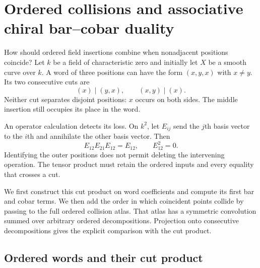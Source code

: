 \newcommand{\ogdcC}{\mathcal C}
\newcommand{\ogdDMod}{\operatorname{DMod}}
\newcommand{\ogdOrd}{\operatorname{Ord}}
\newcommand{\ogdOSurj}{\mathsf{OSurj}}
\newcommand{\ogdAlg}{\operatorname{Alg}}
\newcommand{\ogdCoalg}{\operatorname{Coalg}}
\newcommand{\ogdMod}{\operatorname{Mod}}
\newcommand{\ogdComod}{\operatorname{Comod}}
\newcommand{\ogdSym}{\operatorname{Sym}}
\newcommand{\ogdCE}{\operatorname{CE}}
\newcommand{\ogdTW}{\operatorname{TW}}
\newcommand{\ogdid}{\mathrm{id}}
\newcommand{\ogdone}{K}
\newcommand{\ogdUU}{\mathscr U}
\newcommand{\ogdotex}{\mathbin{\otimes^!}}
\newcommand{\ogdotexd}{\mathbin{\otimes^{\mathbb D}}}
\newcommand{\ogdciteFG}{\cite{chhop:FG}}
\newcommand{\ogdciteAKY}{\cite{S4aAlfonsiKimYoung}}

\chapter{Ordered collisions and associative chiral bar--cobar duality}
\label{ogd:foundation}

How should ordered field insertions combine when nonadjacent positions
coincide? Let\label{ogd:def:initial-curve-base} $k$ be a field of characteristic zero and initially let
$X$ be a smooth curve over $k$. A word of three positions can have the form
$(x,y,x)$ with $x\ne y$. Its two consecutive cuts are
\[
 (x)\mid(y,x),\qquad (x,y)\mid(x).
\]
Neither cut separates disjoint positions: $x$ occurs on both sides.
The middle insertion still occupies its place in the word.

An operator calculation detects its loss. On $k^2$, let $E_{ij}$ send
the $j$th basis vector to the $i$th and annihilate the other basis vector.
Then
\[
 E_{12}E_{21}E_{12}=E_{12},\qquad E_{12}^2=0.
\]
Identifying the outer positions does not permit deleting the intervening
operation. The tensor product must retain the ordered inputs and every
equality that crosses a cut.

We first construct this cut product on word coefficients and compute
its first bar and cobar terms. We then add the order in which coincident
points collide by passing to the full ordered collision atlas.
That atlas has a symmetric convolution summed over arbitrary ordered
decompositions. Projection onto consecutive decompositions gives the
explicit comparison with the cut product.

\section{Ordered words and their cut product}
\label{ogd:sec:cut-support}

